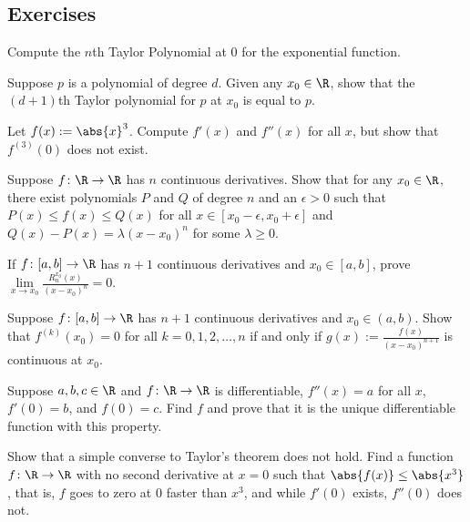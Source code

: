 \documentclass[12pt]{book}
\begin{document}
\subsection*{Exercises}

\begin{exercise}
Compute the $n$th Taylor Polynomial at $0$ for the exponential function.
\end{exercise}

\begin{exercise}
Suppose $p$ is a polynomial of degree $d$.
Given any $x_0 \in \R$,
show that
the $(d+1)$th Taylor polynomial for $p$ at $x_0$ is equal to $p$.
\end{exercise}

\begin{exercise}
Let $f(x) := \abs{x}^3$.
Compute $f'(x)$ and $f''(x)$ for all $x$,
but show that $f^{(3)}(0)$ does not exist.
\end{exercise}

\begin{exercise}
Suppose $f \colon \R \to \R$ has $n$ continuous derivatives.
Show
that for any $x_0 \in \R$,
there exist polynomials $P$ and $Q$ of degree $n$ and 
an $\epsilon > 0$ such that $P(x) \leq f(x) \leq Q(x)$ for all $x \in
[x_0-\epsilon,x_0+\epsilon]$  and
$Q(x)-P(x) = \lambda {(x-x_0)}^n$ for some $\lambda \geq 0$.
\end{exercise}

\begin{exercise}
If $f \colon [a,b] \to \R$ has $n+1$ continuous derivatives
and $x_0 \in [a,b]$,
prove
$\lim\limits_{x\to x_0} \frac{R_n^{x_0}(x)}{{(x-x_0)}^n} = 0$.
\end{exercise}

\begin{exercise}
Suppose $f \colon [a,b] \to \R$ has $n+1$ continuous derivatives
and $x_0 \in (a,b)$.
Show that $f^{(k)}(x_0) = 0$ for all $k = 0, 1, 2, \ldots, n$
if and only if $g(x) := \frac{f(x)}{{(x-x_0)}^{n+1}}$ is continuous at $x_0$.
\end{exercise}

\begin{exercise}
Suppose $a,b,c \in \R$ and $f \colon \R \to \R$ is differentiable,
$f''(x) = a$ for all $x$, $f'(0) = b$, and $f(0) = c$.
Find $f$ and prove that 
it is the unique differentiable function with this property.
\end{exercise}

\begin{exercise}[Challenging]
Show that a simple converse to Taylor's theorem does not hold.
Find a function $f \colon \R \to \R$ with no second derivative at $x=0$ such that
$\abs{f(x)} \leq \abs{x^3}$, that is, $f$ goes to zero at 0 faster than $x^3$, and
while $f'(0)$ exists, $f''(0)$ does not.
\end{exercise}
\end{document}
